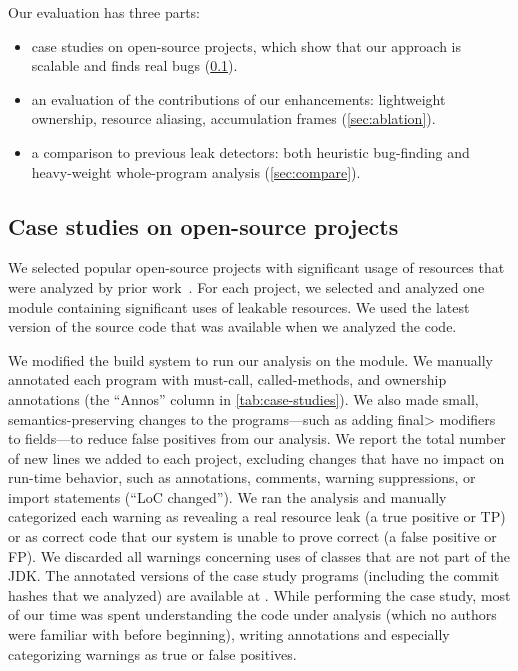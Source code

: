 Our evaluation has three parts:
\begin{itemize}
\item case studies on open-source projects, which show that our approach
  is scalable and finds real bugs (\cref{sec:case-studies}).
\item an evaluation of the contributions of our enhancements:
  lightweight ownership, %
  resource aliasing, %
  accumulation frames %
  (\cref{sec:ablation}).
\item a comparison to previous leak detectors:  both heuristic bug-finding
  and heavy-weight whole-program
  analysis (\cref{sec:compare}).
\end{itemize}

\subsection{Case studies on open-source projects}
\label{sec:case-studies}

We selected  popular open-source projects with significant
usage of resources that were analyzed by prior work~\cite{zuo2019grapple}.
For each project, we selected and analyzed one module
containing significant uses of leakable resources. We used
the latest version of the source code that was available
when we analyzed the code.

We modified the
build system to run our analysis on the module. We manually
annotated each program with must-call, called-methods, and ownership
annotations (the ``Annos'' column in \cref{tab:case-studies}).
We also
made small, semantics-preserving changes to the programs---such as adding
\<final> modifiers to fields---to reduce
false positives from our analysis. We report the total number
of new lines we added to each project, excluding changes
that have no impact on run-time behavior, such as annotations, comments,
warning suppressions, or import statements (``LoC changed'').
We ran the analysis and manually categorized each warning as revealing a
real resource leak (a true positive or TP) or as correct code that our
system is unable to prove correct (a false positive or FP\@).
We discarded all warnings concerning uses of classes that are not
part of the JDK.
The
annotated versions of the case study programs (including
the commit hashes that we analyzed) are available at
.
While performing the case study, most of our time was spent
understanding the code under analysis (which no authors were familiar
with before beginning), writing annotations and especially categorizing
warnings as true or false positives.

